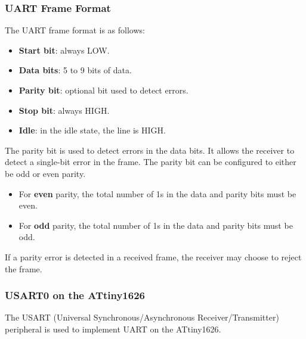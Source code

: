 \documentclass{report}
\begin{document}
\subsubsection{UART Frame Format}
The UART frame format is as follows:
\begin{itemize}
    \item \textbf{Start bit}: always LOW\@.
    \item \textbf{Data bits}: 5 to 9 bits of data\@.
    \item \textbf{Parity bit}: optional bit used to detect errors.
    \item \textbf{Stop bit}: always HIGH\@.
    \item \textbf{Idle}: in the idle state, the line is HIGH\@.
\end{itemize}
The parity bit is used to detect errors in the data bits. It allows the receiver to
detect a single-bit error in the frame. The parity bit can be configured to either be
odd or even parity.
\begin{itemize}
    \item For \textbf{even} parity, the total number of 1s in the data and parity bits must be even.
    \item For \textbf{odd} parity, the total number of 1s in the data and parity bits must be odd.
\end{itemize}
If a parity error is detected in a received frame, the receiver may choose to reject the frame.
\subsubsection{USART0 on the ATtiny1626}
The USART (Universal Synchronous/Asynchronous Receiver/Transmitter)
peripheral is used to implement UART on the ATtiny1626.
\end{document}
